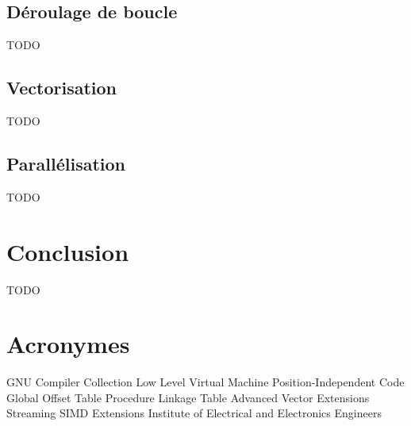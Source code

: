 \documentclass[12pt,a4paper]{article}
\begin{document}
\subsection{Déroulage de boucle}
\label{sub.optim.unrol}

TODO

\subsection{Vectorisation}
\label{sub.optim.vec}

TODO

\subsection{Parallélisation}
\label{sub.optim.parall}

TODO

\section{Conclusion}
\label{sec.conc}

TODO

\newpage
\section*{Acronymes}
\label{sec.acro}

\begin{acronym}
      {GNU Compiler Collection}
     {Low Level Virtual Machine}
      {Position-Independent Code}
      {Global Offset Table}
      {Procedure Linkage Table}
      {Advanced Vector Extensions}
      {Streaming SIMD Extensions}
     {Institute of Electrical and Electronics Engineers}
\end{acronym}
\end{document}
